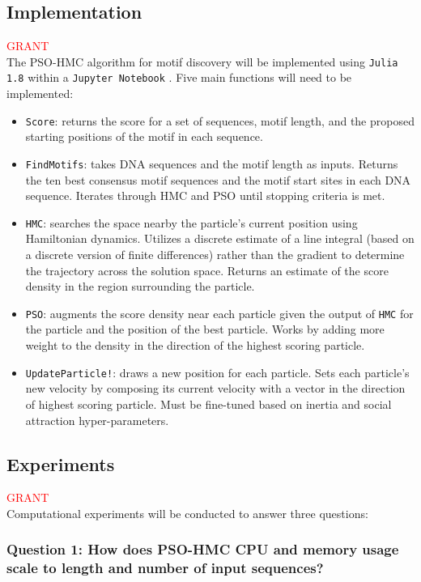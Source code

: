 \documentclass{article}
\begin{document}
\subsection{Implementation}
\textcolor{red}{GRANT} \\
The PSO-HMC algorithm for motif discovery will be implemented using \texttt{Julia 1.8} \cite{Julia-2017} within a  \texttt{Jupyter Notebook}  \cite{Kluyver2016jupyter}. Five main functions will need to be implemented:
\begin{itemize}
	\item \texttt{Score}: returns the score for a set of sequences, motif length, and the proposed starting positions of the motif in each sequence.
	\item \texttt{FindMotifs}: takes DNA sequences and the motif length as inputs. Returns the ten best consensus motif sequences and the motif start sites in each DNA sequence. Iterates through HMC and PSO until stopping criteria is met.
	\item \texttt{HMC}: searches the space nearby the particle's current position using Hamiltonian dynamics. Utilizes a discrete estimate of a line integral (based on a discrete version of finite differences) rather than the gradient to determine the trajectory across the solution space. Returns an estimate of the score density in the region surrounding the particle.
	\item \texttt{PSO}: augments the score density near each particle given the output of \texttt{HMC} for the particle and the position of the best particle. Works by adding more weight to the density in the direction of the highest scoring particle.
	\item \texttt{UpdateParticle!}: draws a new position for each particle. Sets each particle's new velocity by composing its current velocity with a vector in the direction of highest scoring particle. Must be fine-tuned based on inertia and social attraction hyper-parameters.
\end{itemize}
\subsection{Experiments}
\textcolor{red}{GRANT} \\
Computational experiments will be conducted to answer three questions:
\subsubsection{Question 1: How does PSO-HMC CPU and memory usage scale to length and number of input sequences?}
\end{document}
